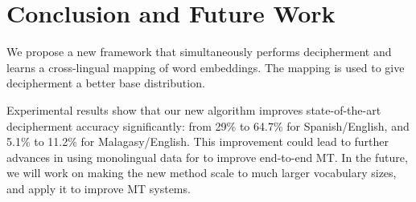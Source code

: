 \section{Conclusion and Future Work}

We propose a new framework that simultaneously performs decipherment and learns a cross-lingual mapping of word embeddings. The mapping is used to give decipherment a better base distribution. 

Experimental results show that our new algorithm improves state-of-the-art decipherment accuracy significantly: from 29\% to 64.7\% for Spanish/English, and 5.1\% to 11.2\% for Malagasy/English. This improvement could lead to further advances in using monolingual data for to improve end-to-end MT.
In the future, we will work on making the new method scale to much larger vocabulary sizes, and apply it to improve MT systems.